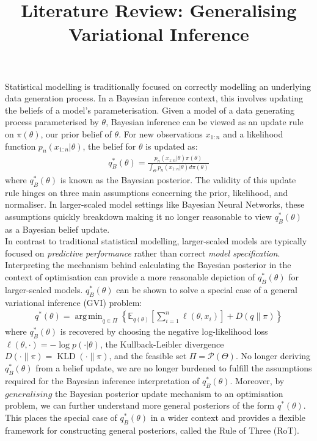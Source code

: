 \documentclass[twoside,11pt]{article}
\newcommand{\KLD}{\operatorname{KLD}}
\DeclareMathOperator*{\argmin}{arg\,min}
\begin{document}
\title{Literature Review: Generalising Variational Inference}
\maketitle

Statistical modelling is traditionally focused on correctly modelling an underlying data generation process. In a Bayesian inference context, this involves updating the beliefs of a model's parameterisation. Given a model of a data generating process parameterised by $\theta$, Bayesian inference can be viewed as an update rule on $\pi(\theta)$, our prior belief of $\theta$. For new observations $x_{1:n}$ and a likelihood function $p_n(x_{1:n}|\theta)$, the belief for $\theta$ is updated as:
\begin{align}
q_B^*(\theta) = \frac{p_n(x_{1:n}|\theta) \pi(\theta)}{\int_{\Theta} p_n(x_{1:n}|\theta) d \pi(\theta)}
\label{bayesian-posterior}
\end{align}
where $q_B^*(\theta)$ is known as the Bayesian posterior. The validity of this update rule hinges on three main assumptions concerning the prior, likelihood, and normaliser. In larger-scaled model settings like Bayesian Neural Networks, these assumptions quickly breakdown making it no longer reasonable to view $q_B^*(\theta)$ as a Bayesian belief update. \\
\newline 
In contrast to traditional statistical modelling, larger-scaled models are typically focused on \textit{predictive performance} rather than correct \textit{model specification}. Interpreting the mechanism behind calculating the Bayesian posterior in the context of optimisation can provide a more reasonable depiction of $q_B^*(\theta)$ for larger-scaled models. $q_B^*(\theta)$ can be shown to solve a special case of a general variational inference (GVI) problem:
\begin{align}
q^*(\theta) = \argmin_{q \in \Pi} \left\{ \mathbb{E}_{q(\theta)}\left[\sum_{i=1}^n \ell(\theta, x_i)\right] + D(q\|\pi)\right\}
\label{general-posterior}
\end{align}
where $q_B^*(\theta)$ is recovered by choosing the negative log-likelihood loss $\ell(\theta, \cdot) = -\log p(\cdot | \theta)$, the Kullback-Leibler divergence $D(\cdot \| \pi) = \KLD(\cdot \| \pi)$, and the feasible set $\Pi = \mathcal{P}(\Theta)$. No longer deriving $q_B^*(\theta)$ from a belief update, we are no longer burdened to fulfill the assumptions required for the Bayesian inference interpretation of $q_B^*(\theta)$. Moreover, by $\textit{generalising}$ the Bayesian posterior update mechanism to an optimisation problem, we can further understand more general posteriors of the form $q^*(\theta)$. This places the special case of $q_B^*(\theta)$ in a wider context and provides a flexible framework for constructing general posteriors, called the Rule of Three (RoT).
\end{document}
